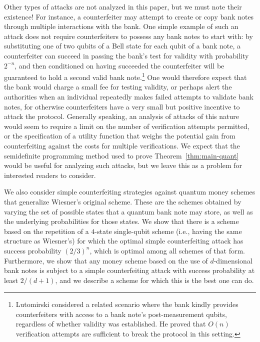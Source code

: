 \documentclass[11pt,letterpaper]{article}
\theoremstyle{definition}
\begin{document}
\noindent
Other types of attacks are not analyzed in this paper, but we must
note their existence!
For instance, a counterfeiter may attempt to create or copy bank notes
through multiple interactions with the bank.
One simple example of such an attack does not require counterfeiters
to possess any bank notes to start with: by substituting one of two
qubits of a Bell state for each qubit of a bank note, a counterfeiter
can succeed in passing the bank's test for validity with probability
$2^{-n}$, and then conditioned on having succeeded the counterfeiter
will be guaranteed to hold a second valid bank note.\footnote{%
  Lutomirski \cite{Lutomirski10} considered a related scenario where
  the bank kindly provides counterfeiters with access to a bank note's
  post-measurement qubits, regardless of whether validity was
  established. He proved that $O(n)$ verification attempts are
  sufficient to break the protocol in this setting.}
One would therefore expect that the bank would charge a small fee
for testing validity, or 
perhaps alert the authorities when an individual repeatedly makes
failed attempts to validate bank notes,
 for otherwise counterfeiters have a very small but
positive incentive to attack the protocol.
Generally speaking, an analysis of attacks of this nature would seem
to require a limit on the number of verification attempts permitted,
or the specification of a utility function that weighs the potential
gain from counterfeiting against the costs for multiple verifications.
We expect that the semidefinite programming method used to prove
Theorem~\ref{thm:main-quant} would be useful for analyzing such
attacks, but we leave this as a problem for interested readers to
consider.


We also consider simple counterfeiting strategies against quantum
money schemes that generalize Wiesner's original scheme.
These are the schemes obtained by varying the set of possible states that
a quantum bank note may store, as well as the underlying probabilities
for those states. We show that there is a scheme based on the repetition
of a $4$-state single-qubit scheme (i.e., having the same structure as
Wiesner's) for which the optimal simple counterfeiting attack has
success probability $(2/3)^n$, which is optimal among all schemes of
that form. 
Furthermore, we show that any money scheme based on the
use of $d$-dimensional bank notes is subject to a simple
counterfeiting attack with success probability at least $2/(d+1)$, and
we describe a scheme for which this is the best one can do. 
\end{document}
